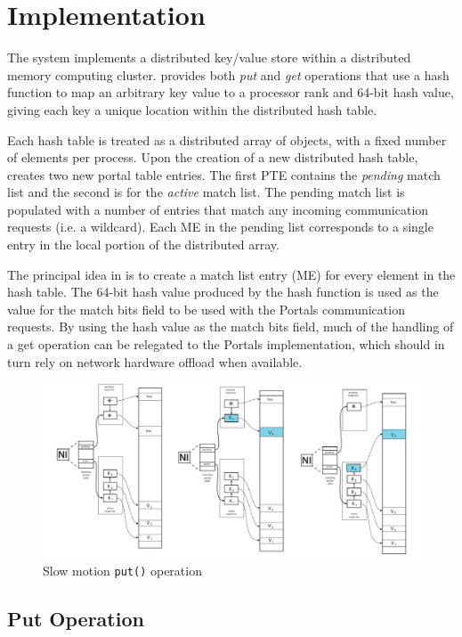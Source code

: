 \section{Implementation}


The \pdht system implements a distributed key/value store within a
distributed memory computing cluster. \pdht provides both {\em put}
and {\em get} operations that use a hash function to map an arbitrary
key value to a processor rank and 64-bit hash value, giving each key a
unique location within the distributed hash table.

Each hash table is treated as a distributed array of objects, with a
fixed number of elements per process. Upon the creation of a new
distributed hash table, \pdht creates two new portal table
entries. The first PTE contains the {\em pending} match list and the
second is for the {\em active} match list. The pending match list is
populated with a number of entries that match any incoming
communication requests (i.e. a wildcard). Each ME in the pending list
corresponds to a single entry in the local portion of the distributed
array.

The principal idea in \pdht is to create a match list entry (ME) for
every element in the hash table. The 64-bit hash value produced by the
hash function is used as the value for the match bits field to be used
with the Portals communication requests. By using the hash value as
the match bits field, much of the handling of a get operation can be
relegated to the Portals implementation, which should in turn rely on
network hardware offload when available.

\begin{figure}[ht]
  \centering
  \includegraphics[width=.75\linewidth]{figs/put}
  \caption{Slow motion {\tt put()} operation}
  \label{fig:put}
\end{figure}


\subsection{Put Operation}


